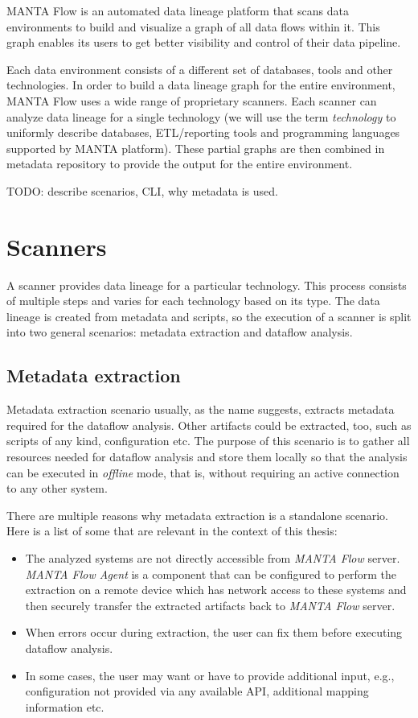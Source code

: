 MANTA Flow is an automated data lineage platform that scans data environments to build and visualize a graph of all data flows within it. This graph enables its users to get better visibility and control of their data pipeline.
\par
Each data environment consists of a different set of databases, tools and other technologies. In order to build a data lineage graph for the entire environment, MANTA Flow uses a wide range of proprietary scanners. Each scanner can analyze data lineage for a single technology (we will use the term \textit{technology} to uniformly describe databases, ETL/reporting tools and programming languages supported by MANTA platform). These partial graphs are then combined in metadata repository to provide the output for the entire environment.
\par
TODO: describe scenarios, CLI, why metadata is used.

\section{Scanners}

A scanner provides data lineage for a particular technology. This process consists of multiple steps and varies for each technology based on its type. The data lineage is created from metadata and scripts, so the execution of a scanner is split into two general scenarios: metadata extraction and dataflow analysis.

\subsection{Metadata extraction}

Metadata extraction scenario usually, as the name suggests, extracts metadata required for the dataflow analysis. Other artifacts could be extracted, too, such as scripts of any kind, configuration etc. The purpose of this scenario is to gather all resources needed for dataflow analysis and store them locally so that the analysis can be executed in \textit{offline} mode, that is, without requiring an active connection to any other system.
\par
There are multiple reasons why metadata extraction is a standalone scenario. Here is a list of some that are relevant in the context of this thesis:
\begin{itemize}
    \item The analyzed systems are not directly accessible from \textit{MANTA Flow} server. \textit{MANTA Flow Agent} is a component that can be configured to perform the extraction on a remote device which has network access to these systems and then securely transfer the extracted artifacts back to \textit{MANTA Flow} server. 
    \item When errors occur during extraction, the user can fix them before executing dataflow analysis.
    \item In some cases, the user may want or have to provide additional input, e.g., configuration not provided via any available API, additional mapping information etc.
\end{itemize}

